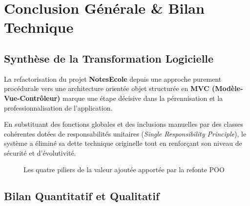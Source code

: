 \documentclass[11pt,a4paper,oneside]{report}
\begin{document}
\chapter{Conclusion Générale \& Bilan Technique}
\label{chap:conclusion}

\section{Synthèse de la Transformation Logicielle}

La refactorisation du projet \textbf{NotesEcole} depuis une approche purement procédurale vers une architecture orientée objet structurée en \textbf{MVC (Modèle-Vue-Contrôleur)} marque une étape décisive dans la pérennisation et la professionnalisation de l'application.

En substituant des fonctions globales et des inclusions manuelles par des classes cohérentes dotées de responsabilités unitaires (\textit{Single Responsibility Principle}), le système a éliminé sa dette technique originelle tout en renforçant son niveau de sécurité et d'évolutivité.

\begin{figure}[H]
    \centering
    \caption{Les quatre piliers de la valeur ajoutée apportée par la refonte POO}
    \label{fig:valeur_ajoutee}
\end{figure}

\section{Bilan Quantitatif et Qualitatif}
\end{document}
